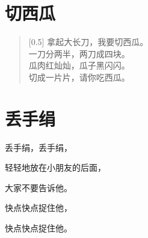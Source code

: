 \documentclass[12pt,UTF-8,openany]{ctexbook}
\begin{document}
\hanzibox{}\hanzibox{}\hanzibox{}\hanzibox{}\hspace{1em}




\chapter{切西瓜}

\begin{large}
    
    \begin{verse}[0.5\linewidth]
        拿起大长刀，我要切西瓜。 \\
        一刀分两半，两刀成四块。 \\
        瓜肉红灿灿，瓜子黑闪闪。 \\
        切成一片片，请你吃西瓜。
    \end{verse}
    
\end{large}


\clearpage

\begin{center}
    
\end{center}


\hanzibox{}\hanzibox{}\hanzibox{}\hanzibox{}\hspace{1em}\hanzibox{}\hanzibox{}\hanzibox{}\hanzibox{}

\hanzibox{}\hanzibox{}\hanzibox{}\hanzibox{}\hspace{1em}\hanzibox{}\hanzibox{}\hanzibox{}\hanzibox{}

\hanzibox{}\hanzibox{}\hanzibox{}\hanzibox{}\hspace{1em}\hanzibox{}\hanzibox{}\hanzibox{}\hanzibox{}

\hanzibox{}\hanzibox{}\hanzibox{}\hanzibox{}\hspace{1em}




\chapter{丢手绢}

\begin{large}
    
    丢手绢，丢手绢，
    
    轻轻地放在小朋友的后面，
    
    大家不要告诉他。
    
    快点快点捉住他，
    
    快点快点捉住他。
    
\end{large}
\end{document}
